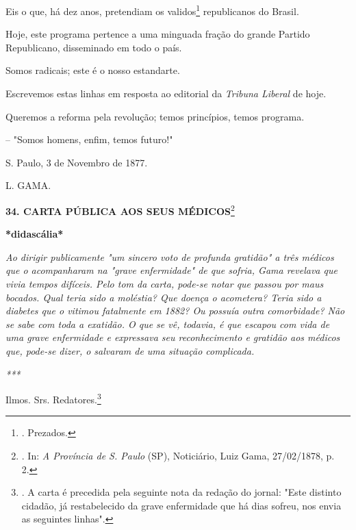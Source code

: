 Eis o que, há dez anos, pretendiam os validos\footnote{. Prezados.}
republicano\protect\hypertarget{Secao_Sem_Titulo-46}{}{}s do Brasil.

Hoje, este programa pertence a uma minguada fração do grande Partido
Republicano, disseminado em todo o país.

Somos radicais; este é o nosso estandarte.

Escrevemos estas linhas em resposta ao editorial da \emph{Tribuna
Liberal} de hoje.

Queremos a reforma pela revolução; temos princípios, temos programa.

-- "Somos homens, enfim, temos futuro!"

S. Paulo, 3 de Novembro de 1877.

L. GAMA.

\textbf{34. CARTA PÚBLICA AOS SEUS MÉDICOS}\footnote{. In: \emph{A
  Província de S. Paulo} (SP), Noticiário, Luiz Gama, 27/02/1878, p. 2.}

\textbf{*didascália*}

\emph{Ao dirigir publicamente "um sincero voto de profunda gratidão" a
três médicos que o acompanharam na "grave enfermidade" de que sofria,
Gama revelava que vivia tempos difíceis. Pelo tom da carta, pode-se
notar que passou por maus bocados. Qual teria sido a moléstia? Que
doença o acometera? Teria sido a diabetes que o vitimou fatalmente em
1882? Ou possuía outra comorbidade? Não se sabe com toda a exatidão. O
que se vê, todavia, é que escapou com vida de uma grave enfermidade e
expressava seu reconhecimento e gratidão aos médicos que, pode-se dizer,
o salvaram de uma situação complicada.}

\emph{***}

Ilmos. Srs. Redatores.\footnote{. A carta é precedida pela seguinte nota
  da redação do jornal: "Este distinto cidadão, já restabelecido da
  grave enfermidade que há dias sofreu, nos envia as seguintes linhas".}

